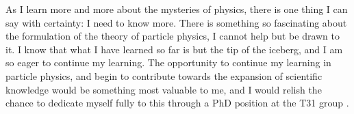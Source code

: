 \documentclass[11pt, a4paper]{awesome-cv}
\newcommand\research{T31 group }
\begin{document}
\begin{cvletter}
As I learn more and more about the mysteries of physics, there is one thing I can say with certainty: I need to know more. 
There is something so fascinating about the formulation of the theory of particle physics, I cannot help but be drawn to it. 
I know that what I have learned so far is but the tip of the iceberg, and I am so eager to continue my learning. 
The opportunity to continue my learning in particle physics, and begin to contribute towards the expansion of scientific knowledge would be something most valuable to me, and I would relish the chance to dedicate myself fully to this through a PhD position at the \research. 

\end{cvletter}


\makeletterclosing
\end{document}
